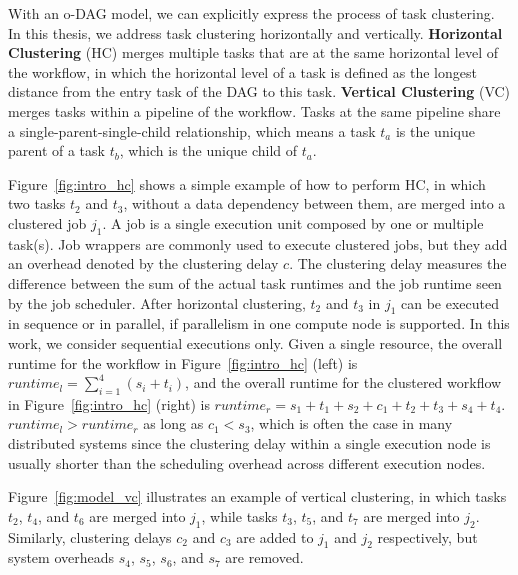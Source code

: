 


With an o-DAG model, we can explicitly express the process of task clustering. In this thesis, we address task clustering horizontally and vertically. \textbf{Horizontal Clustering} (HC) merges multiple tasks that are at the same horizontal level of the workflow, in which the horizontal level of a task is defined as the longest distance from the entry task of the DAG to this task. \textbf{Vertical Clustering} (VC) merges tasks within a pipeline of the workflow. Tasks at the same pipeline share a single-parent-single-child relationship, which means a task $t_a$ is the unique parent of a task $t_b$, which is the unique child of $t_a$. 


Figure~\ref{fig:intro_hc} shows a simple example of how to perform HC, in which two tasks $t_2$ and $t_3$, without a data dependency between them, are merged into a clustered job $j_1$. A job is a single execution unit composed by one or multiple task(s). Job wrappers are commonly used to execute clustered jobs, but they add an overhead denoted by the clustering delay $c$. The clustering delay measures the difference between the sum of the actual task runtimes and the job runtime seen by the job scheduler. 
After horizontal clustering, $t_2$ and $t_3$ in $j_1$ can be executed in sequence or in parallel, if parallelism in one compute node is supported. In this work, we consider sequential executions only. Given a single resource, the overall runtime for the workflow in Figure~\ref{fig:intro_hc} (left) is $runtime_l= \sum_{i=1}^{4}(s_i+t_i)$, and the overall runtime for the clustered workflow in Figure~\ref{fig:intro_hc} (right) is $runtime_r=s_1+t_1+s_2+c_1+t_2+t_3+s_4+t_4$.  $runtime_l > runtime_r$ as long as $c_1 < s_3$, which is often the case in many distributed systems since the clustering delay within a single execution node is usually shorter than the scheduling overhead across different execution nodes. 


Figure~\ref{fig:model_vc} illustrates an example of vertical clustering, in which tasks $t_2$, $t_4$, and $t_6$ are merged into $j_1$, while tasks $t_3$, $t_5$, and $t_7$ are merged into $j_2$. Similarly, clustering delays $c_2$ and $c_3$ are added to $j_1$ and $j_2$ respectively, but system overheads $s_4$, $s_5$, $s_6$, and $s_7$ are removed. 



